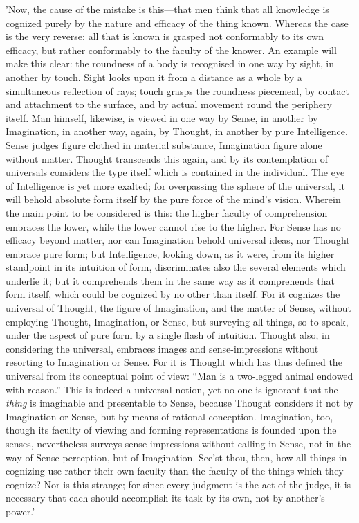 'Now, the cause of the mistake is this—that men think that all
knowledge is cognized purely by the nature and efficacy of the thing
known. Whereas the case is the very reverse: all that is known is
grasped not conformably to its own efficacy, but rather conformably to
the faculty of the knower. An example will make this clear: the
roundness of a body is recognised in one way by sight, in another by
touch. Sight looks upon it from a distance as a whole by a simultaneous
reflection of rays; touch grasps the roundness piecemeal, by contact and
attachment to the surface, and by actual movement round the periphery
itself. Man himself, likewise, is viewed in one way by Sense, in another
by Imagination, in another way, again, by Thought, in another by pure
Intelligence. Sense judges figure clothed in material substance,
Imagination figure alone without matter. Thought transcends this again,
and by its contemplation of universals considers the type itself which
is contained in the individual. The eye of Intelligence is yet more
exalted; for overpassing the sphere of the universal, it will behold
absolute form itself by the pure force of the mind's vision. Wherein the
main point to be considered is this: the higher faculty of comprehension
embraces the lower, while the lower cannot rise to the higher. For Sense
has no efficacy beyond matter, nor can Imagination behold universal
ideas, nor Thought embrace pure form; but Intelligence, looking down, as
it were, from its higher standpoint in its intuition of form,
discriminates also the several elements which underlie it; but it
comprehends them in the same way as it comprehends that form itself,
which could be cognized by no other than itself. For it cognizes the
universal of Thought, the figure of Imagination, and the matter of
Sense, without employing Thought, Imagination, or Sense, but surveying
all things, so to speak, under the aspect of pure form by a single flash
of intuition. Thought also, in considering the universal, embraces
images and sense-impressions without resorting to Imagination or Sense.
For it is Thought which has thus defined the universal from its
conceptual point of view: ``Man is a two-legged animal endowed with
reason.'' This is indeed a universal notion, yet no one is ignorant that
the \emph{thing} is imaginable and presentable to Sense, because Thought
considers it not by Imagination or Sense, but by means of rational
conception. Imagination, too, though its faculty of viewing and forming
representations is founded upon the senses, nevertheless surveys
sense-impressions without calling in Sense, not in the way of
Sense-perception, but of Imagination. See'st thou, then, how all things
in cognizing use rather their own faculty than the faculty of the things
which they cognize? Nor is this strange; for since every judgment is the
act of the judge, it is necessary that each should accomplish its task
by its own, not by another's power.'


